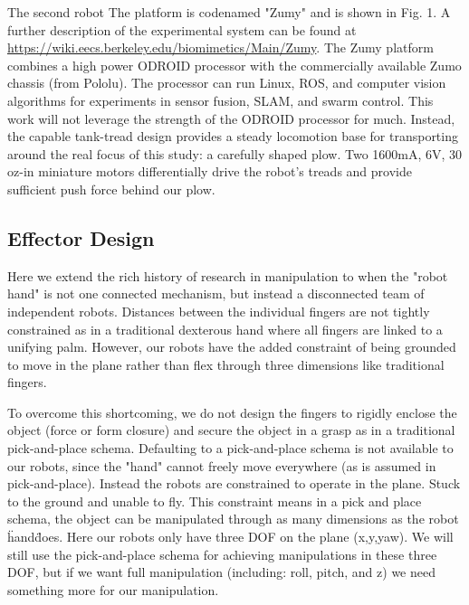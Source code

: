 \documentclass[runningheads,a4paper]{llncs}
\begin{document}
The second robot The platform is codenamed "Zumy" and is shown in Fig. 1.
A further description of the experimental system can be found at \url{https://wiki.eecs.berkeley.edu/biomimetics/Main/Zumy}.
The Zumy platform combines a high power ODROID processor with the commercially available Zumo chassis (from Pololu).
The processor can run Linux, ROS, and computer vision algorithms for experiments in sensor fusion, SLAM, and swarm control.
This work will not leverage the strength of the ODROID processor for much.
Instead, the capable tank-tread design provides a steady locomotion base for transporting around the real focus of this study: a carefully shaped plow.
Two 1600mA, 6V, 30 oz-in miniature motors differentially drive the robot's treads and provide sufficient push force behind our plow.

\subsection{Effector Design}

Here we extend the rich history of research in manipulation to when the "robot hand" is not one connected mechanism, but instead a disconnected team of independent robots.
Distances between the individual fingers are not tightly constrained as in a traditional dexterous hand where all fingers are linked to a unifying palm.
However, our robots have the added constraint of being grounded to move in the plane rather than flex through three dimensions like traditional fingers.

To overcome this shortcoming, we do not design the fingers to rigidly enclose the object (force or form closure) and secure the object in a grasp as in a traditional pick-and-place schema.
Defaulting to a pick-and-place schema is not available to our robots, since the "hand" cannot freely move everywhere (as is assumed in pick-and-place).
Instead the robots are constrained to operate in the plane. Stuck to the ground and unable to fly.
This constraint means in a pick and place schema, the object can be manipulated through as many dimensions as the robot \"hand\" does.
Here our robots only have three DOF on the plane (x,y,yaw).
We will still use the pick-and-place schema for achieving manipulations in these three DOF, but if we want full manipulation (including: roll, pitch, and z) we need something more for our manipulation.
\end{document}
